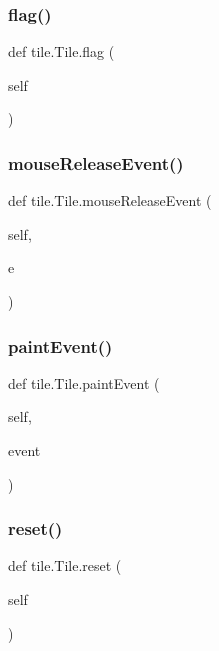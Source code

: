 \mbox{\label{classtile_1_1_tile_a54edcdbf94da0c1d8dab7686fdce8a69}} 
\subsubsection{\texorpdfstring{flag()}{flag()}}
{\footnotesize\ttfamily def tile.\+Tile.\+flag (\begin{DoxyParamCaption}\item[{}]{self }\end{DoxyParamCaption})}

\mbox{\label{classtile_1_1_tile_a0441823c54ba6bbd8c29d9d61ff8161b}} 
\subsubsection{\texorpdfstring{mouseReleaseEvent()}{mouseReleaseEvent()}}
{\footnotesize\ttfamily def tile.\+Tile.\+mouse\+Release\+Event (\begin{DoxyParamCaption}\item[{}]{self,  }\item[{}]{e }\end{DoxyParamCaption})}

\mbox{\label{classtile_1_1_tile_af14e5b7f51340e91c603bc032c43d8d5}} 
\subsubsection{\texorpdfstring{paintEvent()}{paintEvent()}}
{\footnotesize\ttfamily def tile.\+Tile.\+paint\+Event (\begin{DoxyParamCaption}\item[{}]{self,  }\item[{}]{event }\end{DoxyParamCaption})}

\mbox{\label{classtile_1_1_tile_aace6248933849675e14c829240fcc4c2}} 
\subsubsection{\texorpdfstring{reset()}{reset()}}
{\footnotesize\ttfamily def tile.\+Tile.\+reset (\begin{DoxyParamCaption}\item[{}]{self }\end{DoxyParamCaption})}

